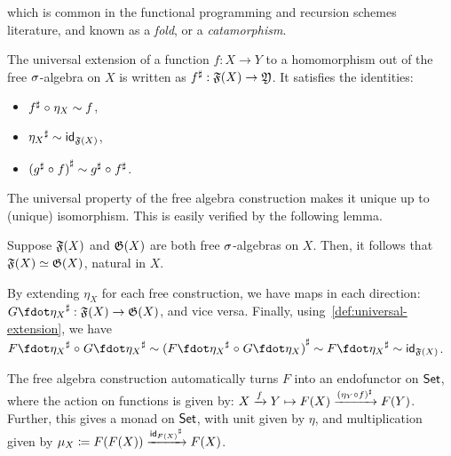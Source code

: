 which is common in the functional programming and recursion schemes literature, and known as a \emph{fold},
or a \emph{catamorphism}.
%
\begin{definition}
    \label{def:universal-extension}
    The universal extension of a function $f : X \to Y$ to a homomorphism out of the free $\sigma$-algebra on $X$ is written
    as ${f}^{\sharp} : \mathfrak{F}(X) \to \mathfrak{Y}$.
    It satisfies the identities:
    \begin{itemize}
        \item ${f}^{\sharp} \mathrel{\circ} \eta_X \mathrel{\sim} f$,
        \item ${\eta_{X}}^{\sharp} \mathrel{\sim} \operatorname{\mathsf{id}}_{\mathfrak{F}(X)}$,
        \item ${({g}^{\sharp} \mathrel{\circ} f)}^{\sharp} \mathrel{\sim} {g}^{\sharp} \mathrel{\circ} {f}^{\sharp}$.
    \end{itemize}
\end{definition}

The universal property of the free algebra construction makes it unique up to (unique) isomorphism.
%
This is easily verified by the following lemma.
\begin{proposition}
    \label{lem:free-algebras-unique}
    Suppose $\mathfrak{F}(X)$ and $\mathfrak{G}(X)$ are both free $\sigma$-algebras on $X$.
    Then, it follows that $\mathfrak{F}(X) \mathrel{\simeq} \mathfrak{G}(X)$, natural in $X$.
\end{proposition}
\begin{proofsketch}
    By extending $\eta_X$ for each free construction,
    we have maps in each direction:
    ${\ext{G\fdot\eta_{X}} : \str{F}(X) \to \str{G}(X)}$, and vice versa.
    Finally, using~\cref{def:universal-extension}, we have
    \(
    {\ext{F\fdot\eta_{X}} \comp \ext{G\fdot\eta_{X}}} \htpy
    {\ext{(\ext{F\fdot\eta_{X}} \comp G\fdot\eta_{X})}} \htpy
    {\ext{F\fdot\eta_{X}}} \htpy
    {\idfunc_{\str{F}(X)}}
    \).
\end{proofsketch}
The free algebra construction automatically turns $F$ into an endofunctor on $\mathsf{Set}$,
where the action on functions is given by:
$X \xrightarrow{f} Y \mapsto F(X) \xrightarrow{{(\eta_{Y} \mathrel{\circ} f)}^{\sharp}} F(Y)$.
%
Further, this gives a monad on $\mathsf{Set}$, with unit given by $\eta$,
and multiplication given by $\mu_{X} \mathrel{\coloneq} F(F(X)) \xrightarrow{{\operatorname{\mathsf{id}}_{F(X)}}^{\sharp}} F(X)$.

